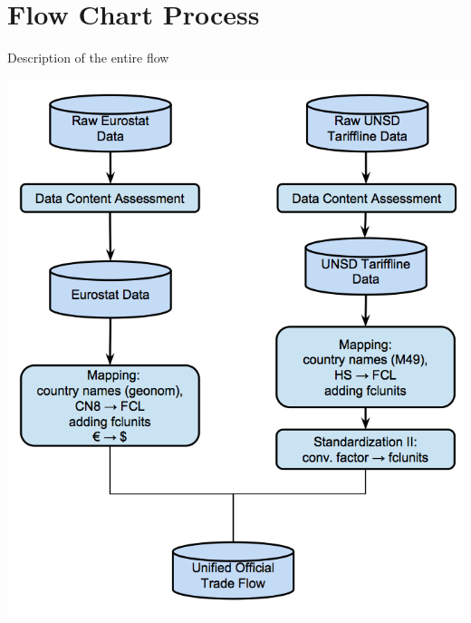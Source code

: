 \documentclass[nojss]{jss}\usepackage[]{graphicx}\usepackage[]{color}
\begin{document}
\section{Flow Chart Process}
Description of the entire flow
\begin{center}\includegraphics[scale = 0.01]{"trade_1"}\end{center}
\newpage
\end{document}
